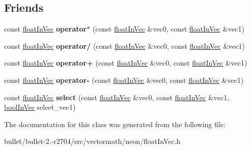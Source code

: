 \subsection*{Friends}
\begin{DoxyCompactItemize}
\item 
\hypertarget{class_vectormath_1_1float_in_vec_a3245c1626b36c482334db45b5b86721c}{const \hyperlink{class_vectormath_1_1float_in_vec}{float\+In\+Vec} {\bfseries operator$\ast$} (const \hyperlink{class_vectormath_1_1float_in_vec}{float\+In\+Vec} \&vec0, const \hyperlink{class_vectormath_1_1float_in_vec}{float\+In\+Vec} \&vec1)}\label{class_vectormath_1_1float_in_vec_a3245c1626b36c482334db45b5b86721c}

\item 
\hypertarget{class_vectormath_1_1float_in_vec_a45e96ad304260d908bfc6d2b51b210d2}{const \hyperlink{class_vectormath_1_1float_in_vec}{float\+In\+Vec} {\bfseries operator/} (const \hyperlink{class_vectormath_1_1float_in_vec}{float\+In\+Vec} \&vec0, const \hyperlink{class_vectormath_1_1float_in_vec}{float\+In\+Vec} \&vec1)}\label{class_vectormath_1_1float_in_vec_a45e96ad304260d908bfc6d2b51b210d2}

\item 
\hypertarget{class_vectormath_1_1float_in_vec_a9e67ab843002e647fa7bb2caed760bdc}{const \hyperlink{class_vectormath_1_1float_in_vec}{float\+In\+Vec} {\bfseries operator+} (const \hyperlink{class_vectormath_1_1float_in_vec}{float\+In\+Vec} \&vec0, const \hyperlink{class_vectormath_1_1float_in_vec}{float\+In\+Vec} \&vec1)}\label{class_vectormath_1_1float_in_vec_a9e67ab843002e647fa7bb2caed760bdc}

\item 
\hypertarget{class_vectormath_1_1float_in_vec_ac6c858483e69952c29682d153854fbe2}{const \hyperlink{class_vectormath_1_1float_in_vec}{float\+In\+Vec} {\bfseries operator-\/} (const \hyperlink{class_vectormath_1_1float_in_vec}{float\+In\+Vec} \&vec0, const \hyperlink{class_vectormath_1_1float_in_vec}{float\+In\+Vec} \&vec1)}\label{class_vectormath_1_1float_in_vec_ac6c858483e69952c29682d153854fbe2}

\item 
\hypertarget{class_vectormath_1_1float_in_vec_a2970b847bee6dc51a58e7b308ab866c0}{const \hyperlink{class_vectormath_1_1float_in_vec}{float\+In\+Vec} {\bfseries select} (const \hyperlink{class_vectormath_1_1float_in_vec}{float\+In\+Vec} \&vec0, const \hyperlink{class_vectormath_1_1float_in_vec}{float\+In\+Vec} \&vec1, \hyperlink{class_vectormath_1_1bool_in_vec}{bool\+In\+Vec} select\+\_\+vec1)}\label{class_vectormath_1_1float_in_vec_a2970b847bee6dc51a58e7b308ab866c0}

\end{DoxyCompactItemize}


The documentation for this class was generated from the following file\+:\begin{DoxyCompactItemize}
\item 
bullet/bullet-\/2.-\/r2704/src/vectormath/neon/float\+In\+Vec.\+h\end{DoxyCompactItemize}
